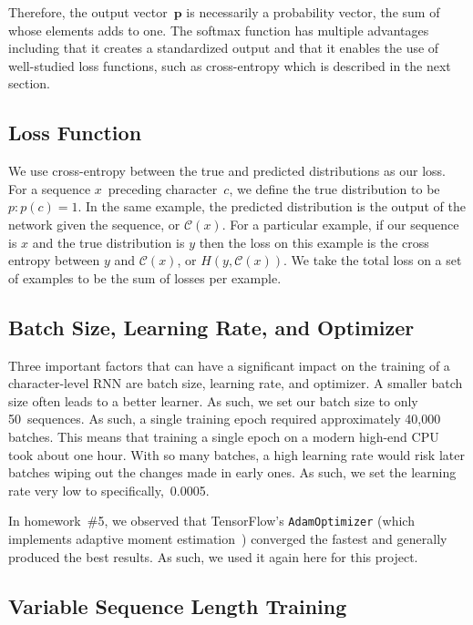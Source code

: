 \documentclass{article}
\begin{document}
Therefore, the output vector~$\mathbf{p}$ is necessarily a probability vector, the sum of whose elements adds to one. The softmax function has multiple advantages including that it creates a standardized output and that it enables the use of well-studied loss functions, such as cross-entropy which is described in the next section.

\subsection{Loss Function}

We use cross-entropy between the true and predicted distributions as our loss. For a sequence $x$~preceding character~$c$, we define the true distribution to be $p: p(c) = 1$. In the same example, the predicted distribution is the output of the network given the sequence, or $\mathcal{C}(x)$. For a particular example, if our sequence is $x$ and the true distribution is $y$ then the loss on this example is the cross entropy between $y$ and $\mathcal{C}(x)$, or $H(y, \mathcal{C}(x))$. We take the total loss on a set of examples to be the sum of losses per example.

\subsection{Batch Size, Learning Rate, and Optimizer}

Three important factors that can have a significant impact on the training of a character-level RNN are batch size, learning rate, and optimizer.  A smaller batch size often leads to a better learner.  As such, we set our batch size to only 50~sequences.  As such, a single training epoch required approximately 40,000 batches. This means that training a single epoch on a modern high-end CPU took about one hour.  With so many batches, a high learning rate would risk later batches wiping out the changes made in early ones.  As such, we set the learning rate very low to specifically,~0.0005. 

In homework~\#5, we observed that TensorFlow's \texttt{AdamOptimizer} (which implements adaptive moment estimation~\cite{kingma2014}) converged the fastest and generally produced the best results.  As such, we used it again here for this project.  

\subsection{Variable Sequence Length Training}
\end{document}

